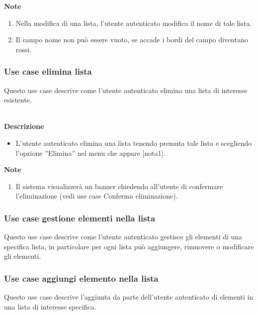 \documentclass[a4paper,12pt]{article}
\begin{document}
\textbf{Note}
\begin{enumerate} \setlength\itemsep{0.01em}
\item Nella modifica di una lista, l'utente autenticato modifica il nome di tale lista.
\item Il campo nome non può essere vuoto, se accade i bordi del campo diventano rossi.
\end{enumerate}



\subsubsection*{Use case elimina lista}

Questo use case descrive come l'utente autenticato elimina una lista di interesse esistente.

\textbf{\\Descrizione}
\begin{itemize} \setlength\itemsep{0.01em}
\item L'utente autenticato elimina una lista tenendo premuta tale lista e scegliendo l'opzione ''Elimina'' nel menu che appare [nota1].
\end{itemize}

\textbf{Note}
\begin{enumerate} \setlength\itemsep{0.01em}
\item Il sistema visualizzerà un banner chiedendo all'utente di confermare l'eliminazione (vedi use case Conferma eliminazione).
\end{enumerate}





\subsubsection*{Use case gestione elementi nella lista}

Questo use case descrive come l'utente autenticato gestisce gli elementi di una specifica lista, in particolare per ogni lista può aggiungere, rimuovere o modificare gli elementi.


\subsubsection*{Use case aggiungi elemento nella lista}

Questo use case descrive l'aggiunta da parte dell'utente autenticato di elementi in una lista di interesse specifica.
\end{document}
